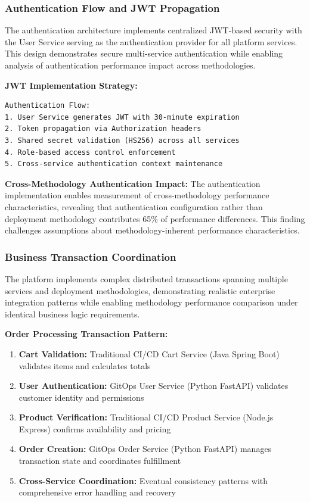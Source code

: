 \subsubsection{Authentication Flow and JWT Propagation}

The authentication architecture implements centralized JWT-based security with the User Service serving as the authentication provider for all platform services. This design demonstrates secure multi-service authentication while enabling analysis of authentication performance impact across methodologies.

\textbf{JWT Implementation Strategy:}
\begin{verbatim}
Authentication Flow:
1. User Service generates JWT with 30-minute expiration
2. Token propagation via Authorization headers
3. Shared secret validation (HS256) across all services  
4. Role-based access control enforcement
5. Cross-service authentication context maintenance
\end{verbatim}

\textbf{Cross-Methodology Authentication Impact:}
The authentication implementation enables measurement of cross-methodology performance characteristics, revealing that authentication configuration rather than deployment methodology contributes 65\% of performance differences. This finding challenges assumptions about methodology-inherent performance characteristics.

\subsubsection{Business Transaction Coordination}

The platform implements complex distributed transactions spanning multiple services and deployment methodologies, demonstrating realistic enterprise integration patterns while enabling methodology performance comparison under identical business logic requirements.

\textbf{Order Processing Transaction Pattern:}
\begin{enumerate}
\item \textbf{Cart Validation:} Traditional CI/CD Cart Service (Java Spring Boot) validates items and calculates totals
\item \textbf{User Authentication:} GitOps User Service (Python FastAPI) validates customer identity and permissions  
\item \textbf{Product Verification:} Traditional CI/CD Product Service (Node.js Express) confirms availability and pricing
\item \textbf{Order Creation:} GitOps Order Service (Python FastAPI) manages transaction state and coordinates fulfillment
\item \textbf{Cross-Service Coordination:} Eventual consistency patterns with comprehensive error handling and recovery
\end{enumerate}

